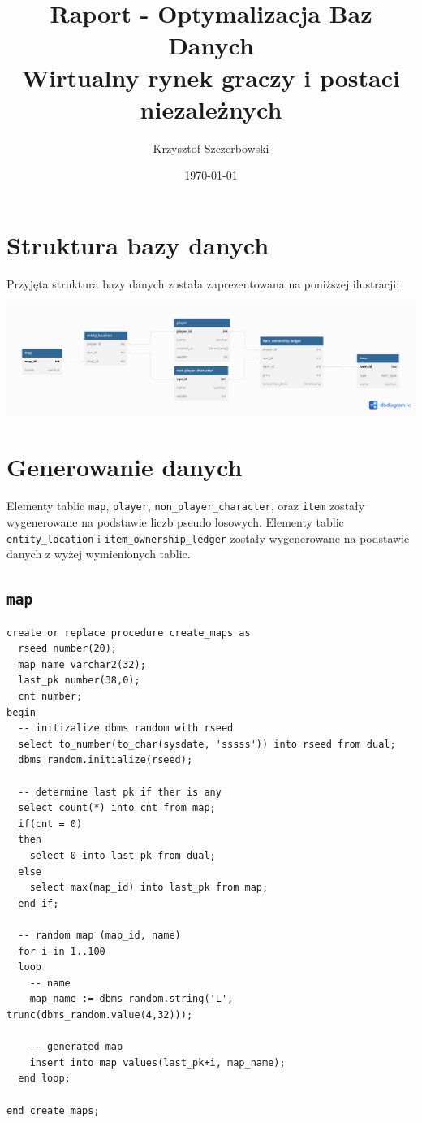 \documentclass[11pt]{article}
\author{Krzysztof Szczerbowski}
\date{\today}
\title{Raport - Optymalizacja Baz Danych\\\medskip
\large Wirtualny rynek graczy i postaci niezależnych}
\begin{document}
\maketitle
\tableofcontents


\section{Struktura bazy danych}
\label{sec:org84076f9}
Przyjęta struktura bazy danych została zaprezentowana na poniższej ilustracji:
\begin{center}
\includegraphics[width=.9\linewidth]{./structure/mmo-backbone.png}
\end{center}

\section{Generowanie danych}
\label{sec:orgb48d85c}
Elementy tablic \texttt{map}, \texttt{player}, \texttt{non\_player\_character}, oraz \texttt{item} zostały wygenerowane na
podstawie liczb pseudo losowych. Elementy tablic \texttt{entity\_location} i \texttt{item\_ownership\_ledger}
zostały wygenerowane na podstawie danych z wyżej wymienionych tablic.

\subsection{\texttt{map}}
\label{sec:org7ff6e76}
\begin{verbatim}
create or replace procedure create_maps as
  rseed number(20);
  map_name varchar2(32);
  last_pk number(38,0);
  cnt number;
begin
  -- initizalize dbms random with rseed
  select to_number(to_char(sysdate, 'sssss')) into rseed from dual;
  dbms_random.initialize(rseed);

  -- determine last pk if ther is any
  select count(*) into cnt from map;
  if(cnt = 0)
  then
    select 0 into last_pk from dual;
  else
    select max(map_id) into last_pk from map;
  end if;

  -- random map (map_id, name)
  for i in 1..100
  loop
    -- name
    map_name := dbms_random.string('L', trunc(dbms_random.value(4,32)));

    -- generated map
    insert into map values(last_pk+i, map_name);
  end loop;

end create_maps;
\end{verbatim}
\end{document}
